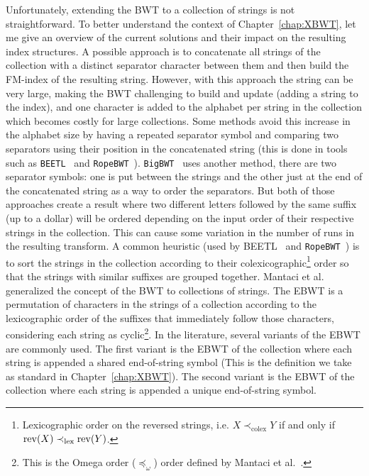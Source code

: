 Unfortunately, extending the BWT to a collection of strings is not straightforward. To better understand the context of Chapter~\ref{chap:XBWT}, let me give an overview of the current solutions and their impact on the resulting index structures. 
A possible approach is to concatenate all strings of the collection with a distinct separator character between them and then build the FM-index of the resulting string. However, with this approach the string can be very large, making the BWT challenging to build and update (adding a string to the index), and one character is added to the alphabet per string in the collection which becomes costly for large collections. Some methods avoid this increase in the alphabet size by having a repeated separator symbol and comparing two separators using their position in the concatenated string (this is done in tools such as \texttt{BEETL}~\cite{Beetl} and \texttt{RopeBWT}~\cite{ropebwt2}).
\texttt{BigBWT}~\cite{boucher2019prefix} uses another method, there are two separator symbols: one is put between the strings and the other just at the end of the concatenated string as a way to order the separators. But both of those approaches create a result where two different letters followed by the same suffix (up to a dollar) will be ordered depending on the input order of their respective strings in the collection. This can cause some variation in the number of runs in the resulting transform. A common heuristic (used by {BEETL}~\cite{Beetl} and \texttt{RopeBWT}~\cite{ropebwt2}) is to sort the strings in the collection according to their colexicographic\footnote{Lexicographic order on the reversed strings, i.e. $X \prec_\mathrm{colex} Y$ if and only if $\mathrm{rev}(X) \prec_\mathrm{lex} \mathrm{rev}(Y)$.} order so that the strings with similar suffixes are grouped together.
Mantaci et al.~\cite{MANTACI2007298} generalized the concept of the BWT to collections of strings. The EBWT is a permutation of characters in the strings of a collection according to the lexicographic order of the suffixes that immediately follow those characters, considering each string as cyclic\footnote{This is the Omega order ($\preccurlyeq_\omega$) order defined by Mantaci et al.~\cite{MANTACI2007298}.}.
In the literature, several variants of the EBWT are commonly used. The first variant is the EBWT of the collection where each string is appended a shared end-of-string symbol (This is the definition we take as standard in Chapter~\ref{chap:XBWT}). The second variant is the EBWT of the collection where each string is appended a unique end-of-string symbol. 

